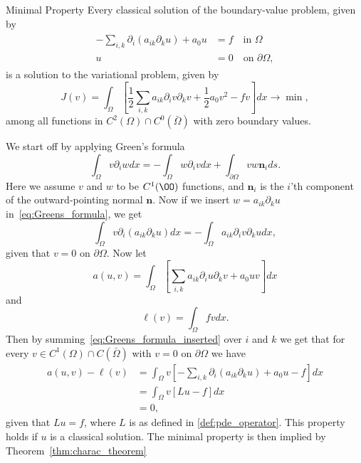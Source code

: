 \begin{thmx}{Minimal Property}
    Every classical solution of the boundary-value problem, given by
\begin{align}
\begin{split}
    -\sum_{i,k} \partial_i (a_{ik}\partial_k u) + a_0 u &= f \quad \text{in } \Omega  \\
    u &= 0 \quad \text{on } \partial \Omega,
\end{split}
\end{align}
    is a solution to the variational problem, given by
    \[
        J(v)=\int_\Omega \left [\frac{1}{2}\sum_{i,k} a_{ik} \partial_i v\partial_k v + \frac{1}{2} a_0 v^2 -fv\right ]dx \longrightarrow \min,
    \]
    among all functions in $C^2(\Omega)\cap C^0(\bar{\Omega})$ with zero boundary values.
    \label{thm:minimal_property} 
\end{thmx}
\begin{bev}
    We start off by applying Green's formula
    \begin{equation}
    \label{eq:Greens_formula}
        \int_\Omega v\partial_i w dx = -\int_\Omega w \partial_i v dx + \int_{\partial \Omega} v w \mathbf{n}_i ds.
    \end{equation}
    Here we assume $v$ and $w$ to be $C^1(\OO)$ functions, and $\mathbf{n}_i$ is the $i$'th component of the outward-pointing normal $\mathbf{n}$.
    Now if we insert $w=a_{ik}\partial_k u$ in~\eqref{eq:Greens_formula}, we get
    \begin{equation}
    \label{eq:Greens_formula_inserted}
        \int_\Omega v\partial_i (a_{ik} \partial_k u) dx = -\int_\Omega a_{ik} \partial_i v\partial_k u dx,
    \end{equation}
    given that $v=0$ on $\partial \Omega$.
    Now let 
    \begin{equation}
    \label{eq:a(u,v)}
        a(u,v) = \int_\Omega \left[\sum_{i,k} a_{ik} \partial_i u \partial_k v +a_0 uv \right]dx
    \end{equation}
    and
    \begin{equation}
    \label{eq:l(v)}
        \ell(v) = \int_\Omega fv dx.
    \end{equation}
    Then by summing~\eqref{eq:Greens_formula_inserted} over $i$ and $k$ we get that for every $v\in C^1(\Omega) \cap C(\bar{\Omega})$ with $v=0$ on $\partial \Omega$ we have
    \begin{align}
        a(u,v) - \ell(v) &= \int_\Omega v\left[ -\sum_{i,k} \partial_i (a_{ik} \partial_k u) + a_0 u - f \right] dx \label{eq:min_prop_variational_problem}\\
        &= \int_\Omega v [Lu - f] dx \nonumber \\
        &= 0, \nonumber
    \end{align}
    given that $Lu = f$, where $L$ is as defined in \eqref{def:pde_operator}. This property holds if $u$ is a classical solution.
     The minimal property is then implied by Theorem~\ref{thm:charac_theorem}
\end{bev}